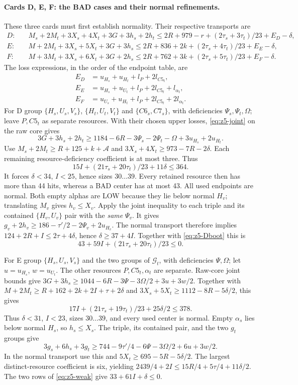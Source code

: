 \documentclass[11pt,letterpaper]{article}
\theoremstyle{definition}\newtheorem{definition}[theorem]{Definition}
\begin{document}
\paragraph{Cards D, E, F: the BAD cases and their normal refinements.}
These three cards must first establish normality. Their respective
transports are
\begin{align*}
D:\quad&M_s+2M_t+3X_s+4X_t+3G+3h_s+2h_t
 \le2R+979-r+(2\tau_s+3\tau_t)/23+E_D-\delta,\\
E:\quad&M+2M_t+3X_s+5X_t+3G+3h_s
 \le2R+836+2k+(2\tau_s+4\tau_t)/23+E_E-\delta,\\
F:\quad&M+3M_t+3X_s+6X_t+3G+2h_s
 \le2R+762+3k+(2\tau_s+5\tau_t)/23+E_F-\delta.
\end{align*}
The loss expressions, in the order of the endpoint table, are
\[
\begin{split}
E_D&=u_{H_s}+u_{H_t}+l_P+2l_{C5_t},\\
E_E&=u_{H_s}+u_{U_t}+l_P+2l_{C5_t}+l_{\alpha_t},\\
E_F&=u_{U_s}+u_{H_t}+l_P+2l_{C5_t}+2l_{\alpha_t}.
\end{split}
\]
For D group $\{H_s,U_s,V_s\}$, $\{H_t,U_t,V_t\}$ and
$\{C6_s,C7_s\}$, with deficiencies $\Psi_s,\Psi_t,\Omega$;
leave $P,C5_t$ as separate resources. With their chosen upper losses,
\eqref{eq:z5-joint} on the raw core gives
\[
 3G+3h_s+2h_t\ge1184-6R-3\Psi_s-2\Psi_t-\Omega
                  +3u_{H_s}+2u_{H_t}.
\]
Use $M_s+2M_t\ge R+125+k+\mathcal A$ and
$3X_s+4X_t\ge973-7R-2\delta$. Each remaining resource-deficiency
coefficient is at most three. Thus
\begin{equation}\label{eq:z5-Dboot}
 15I+(21\tau_s+20\tau_t)/23+11\delta\le364.
\end{equation}
It forces $\delta<34$, $I<25$, hence sizes $30\ldots39$.
Every retained resource then has more than 44 hits, whereas a BAD center
has at most 43. All used endpoints are normal. Both empty alphas are LOW
because they lie below normal $H_v$; translating $M_v$ gives $h_v\le X_v$.
Apply the joint inequality to each triple and its contained
$\{H_v,U_v\}$ pair with the \emph{same} $\Psi_v$. It gives
$g_v+2h_v\ge186-\tau'/2-2\Psi_v+2u_{H_v}$.
The normal transport therefore implies
$124+2R+I\le2\tau+4\delta$, hence $\delta\ge37+4I$.
Together with \eqref{eq:z5-Dboot} this is
\[
 43+59I+(21\tau_s+20\tau_t)/23\le0.
\]

For E group $\{H_s,U_s,V_s\}$ and the two groups of $\mathcal G_t$,
with deficiencies $\Psi,\Omega$; let $u=u_{H_s}$, $w=u_{U_t}$.
The other resources $P,C5_t,\alpha_t$ are separate.
Raw-core joint bounds give
$3G+3h_s\ge1044-6R-3\Psi-3\Omega/2+3u+3w/2$.
Together with
$M+2M_t\ge R+162+2k+2I+\tau+2\delta$ and
$3X_s+5X_t\ge1112-8R-5\delta/2$, this gives
\[
 17I+(21\tau_s+19\tau_t)/23+25\delta/2\le378.
\]
Thus $\delta<31$, $I<23$, sizes $30\ldots39$, and every used center
is normal. Empty $\alpha_s$ lies below normal $H_s$, so $h_s\le X_s$.
The triple, its contained pair, and the two $g_t$ groups give
\[
 3g_s+6h_s+3g_t\ge744-9\tau'/4-6\Psi-3\Omega/2+6u+3w/2.
\]
In the normal transport use this and $5X_t\ge695-5R-5\delta/2$.
The largest distinct-resource coefficient is six, yielding
$2439/4+2I\le15R/4+5\tau/4+11\delta/2$.
The two rows of \eqref{eq:z5-weak} give $33+61I+\delta\le0$.
\end{document}
